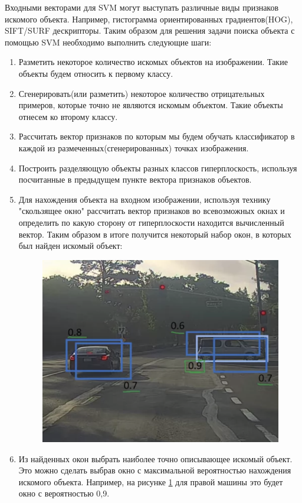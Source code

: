 Входными векторами для SVM могут выступать различные виды признаков искомого объекта. Например, гистограмма ориентированных градиентов(HOG)\cite{b:HOG}, SIFT\cite{b:SIFT}/SURF\cite{b:SURF} дескрипторы.
Таким образом для решения задачи поиска объекта с помощью SVM необходимо выполнить следующие шаги:
\begin{enumerate}
	\item Разметить некоторое количество искомых объектов на изображении. Такие объекты будем относить к первому классу.
	\item Сгенерировать(или разметить) некоторое количество отрицательных примеров, которые точно не являются искомым объектом. Такие объекты отнесем ко второму классу.
	\item Рассчитать вектор признаков по которым мы будем обучать классификатор в каждой из размеченных(сгенерированных) точках изображения.
	\item Построить разделяющую объекты разных классов гиперплоскость, используя посчитанные в предыдущем пункте вектора признаков объектов.
	\item Для нахождения объекта на входном изображении, используя технику "скользящее окно"\cite{b:window} рассчитать вектор признаков во всевозможных окнах и определить по какую сторону от гиперплоскости находится вычисленный вектор. 
	Таким образом в итоге получится некоторый набор окон, в которых был найден искомый объект:
	\begin{figure}[h!]
		\centering
		\includegraphics[width=0.7\linewidth]{pictures/screenshot024}
		\caption{}
		\label{fig:screenshot024}
	\end{figure}
	\newpage
	\item Из найденных окон выбрать наиболее точно описывающее искомый объект. Это можно сделать выбрав окно с максимальной вероятностью нахождения искомого объекта. Например, на рисунке \ref{fig:screenshot024} для правой машины это будет окно с вероятностью 0,9.
\end{enumerate}

